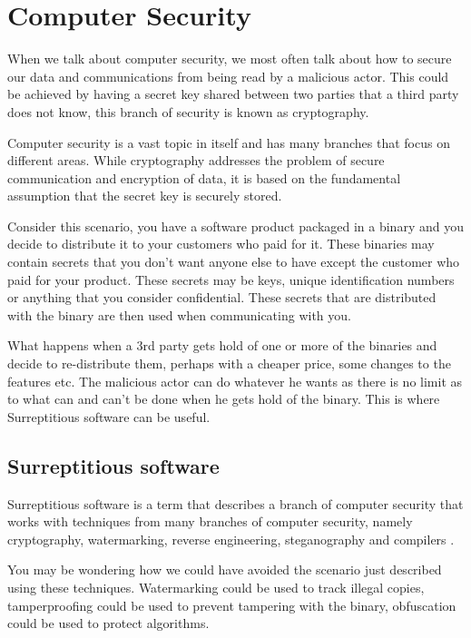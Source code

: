 \section{Computer Security}

When we talk about computer security, we most often talk about how to secure our data and communications from being read by a malicious actor.
This could be achieved by having a secret key shared between two parties that a third party does not know, this branch of security is known as cryptography.

Computer security is a vast topic in itself and has many branches that focus on different areas.
While cryptography addresses the problem of secure communication and encryption of data, 
it is based on the fundamental assumption that the secret key is securely stored.

Consider this scenario, you have a software product packaged in a binary and you decide to distribute it to 
your customers who paid for it. These binaries may contain secrets that you don't want anyone else
to have except the customer who paid for your product. These secrets may be keys, unique identification
numbers or anything that you consider confidential. These secrets that are distributed with the binary
are then used when communicating with you.

What happens when a 3rd party gets hold of one or more of the binaries and decide to re-distribute
them, perhaps with a cheaper price, some changes to the features etc. The malicious actor can do whatever
he wants as there is no limit as to what can and can't be done when he gets hold of the binary. This is 
where Surreptitious software can be useful.

\subsection{Surreptitious software}

Surreptitious software is a term that describes a branch of computer security that works with techniques
from many branches of computer security, namely cryptography, watermarking, reverse engineering, steganography
and compilers \cite{serr-soft}.

You may be wondering how we could have avoided the scenario just described using these techniques.
Watermarking could be used to track illegal copies, tamperproofing could be used to prevent tampering with the binary,
obfuscation could be used to protect algorithms.


